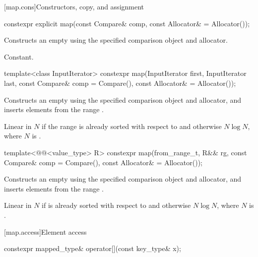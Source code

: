[map.cons]{Constructors, copy, and assignment}%
%

%
\begin{itemdecl}
constexpr explicit map(const Compare& comp, const Allocator& = Allocator());
\end{itemdecl}

\begin{itemdescr}
\pnum
\effects
Constructs an empty
using the specified comparison object and allocator.

\pnum
\complexity
Constant.
\end{itemdescr}

%
\begin{itemdecl}
template<class InputIterator>
  constexpr map(InputIterator first, InputIterator last,
                const Compare& comp = Compare(), const Allocator& = Allocator());
\end{itemdecl}

\begin{itemdescr}
\pnum
\effects
Constructs an empty
using the specified comparison object and allocator,
and inserts elements from the range
.

\pnum
\complexity
Linear in $N$ if the range
is already sorted with respect to 
and otherwise $N \log N$, where $N$
is .
\end{itemdescr}

%
\begin{itemdecl}
template<@@<value_type> R>
  constexpr map(from_range_t, R&& rg, const Compare& comp = Compare(),
                const Allocator& = Allocator());
\end{itemdecl}

\begin{itemdescr}
\pnum
\effects
Constructs an empty 
using the specified comparison object and allocator,
and inserts elements from the range .

\pnum
\complexity
Linear in $N$ if  is already sorted with respect to  and
otherwise $N \log N$, where $N$ is .
\end{itemdescr}

[map.access]{Element access}

%
\begin{itemdecl}
constexpr mapped_type& operator[](const key_type& x);
\end{itemdecl}


